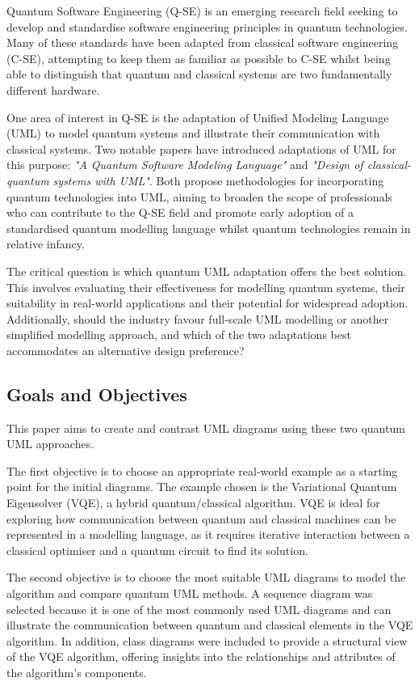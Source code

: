 \documentclass{article}
\begin{document}
Quantum Software Engineering (Q-SE) is an emerging research field seeking to develop and standardise software engineering principles in quantum technologies. Many of these standards have been adapted from classical software engineering (C-SE), attempting to keep them as familiar as possible to C-SE whilst being able to distinguish that quantum and classical systems are two fundamentally different hardware. 

One area of interest in Q-SE is the adaptation of Unified Modeling Language (UML) to model quantum systems and illustrate their communication with classical systems. Two notable papers have introduced adaptations of UML for this purpose: \textit{"A Quantum Software Modeling Language"}\cite{Pérez-Delgado2022} and \textit{"Design of classical-quantum systems with UML"}\cite{Pérez-Castillo2022}. Both propose methodologies for incorporating quantum technologies into UML, aiming to broaden the scope of professionals who can contribute to the Q-SE field and promote early adoption of a standardised quantum modelling language whilst quantum technologies remain in relative infancy. 

The critical question is which quantum UML adaptation offers the best solution. This involves evaluating their effectiveness for modelling quantum systems, their suitability in real-world applications and their potential for widespread adoption. Additionally, should the industry favour full-scale UML modelling or another simplified modelling approach, and which of the two adaptations best accommodates an alternative design preference?

\subsection{Goals and Objectives}

This paper aims to create and contrast UML diagrams using these two quantum UML approaches.

The first objective is to choose an appropriate real-world example as a starting point for the initial diagrams. The example chosen is the Variational Quantum Eigensolver (VQE), a hybrid quantum/classical algorithm. VQE is ideal for exploring how communication between quantum and classical machines can be represented in a modelling language, as it requires iterative interaction between a classical optimiser and a quantum circuit to find its solution. 

The second objective is to choose the most suitable UML diagrams to model the algorithm and compare quantum UML methods. A sequence diagram was selected because it is one of the most commonly used UML diagrams and can illustrate the communication between quantum and classical elements in the VQE algorithm. In addition, class diagrams were included to provide a structural view of the VQE algorithm, offering insights into the relationships and attributes of the algorithm's components.
\end{document}
